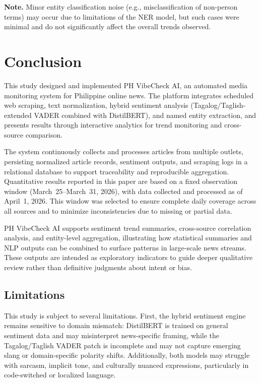\documentclass[sigconf, nonacm]{acmart}
\begin{document}
\textbf{Note.}
Minor entity classification noise (e.g., misclassification of non-person terms) may occur due to limitations of the NER model, but such cases were minimal and do not significantly affect the overall trends observed.

\section{Conclusion}
This study designed and implemented PH VibeCheck AI, an automated media monitoring system for Philippine online news. The platform integrates scheduled web scraping, text normalization, hybrid sentiment analysis (Tagalog/Taglish-extended VADER combined with DistilBERT), and named entity extraction, and presents results through interactive analytics for trend monitoring and cross-source comparison.

The system continuously collects and processes articles from multiple outlets, persisting normalized article records, sentiment outputs, and scraping logs in a relational database to support traceability and reproducible aggregation. Quantitative results reported in this paper are based on a fixed observation window (March~25--March~31, 2026), with data collected and processed as of April~1, 2026. This window was selected to ensure complete daily coverage across all sources and to minimize inconsistencies due to missing or partial data.

PH VibeCheck AI supports sentiment trend summaries, cross-source correlation analysis, and entity-level aggregation, illustrating how statistical summaries and NLP outputs can be combined to surface patterns in large-scale news streams. These outputs are intended as exploratory indicators to guide deeper qualitative review rather than definitive judgments about intent or bias.

\subsection{Limitations}
This study is subject to several limitations. First, the hybrid sentiment engine remains sensitive to domain mismatch: DistilBERT is trained on general sentiment data and may misinterpret news-specific framing, while the Tagalog/Taglish VADER patch is incomplete and may not capture emerging slang or domain-specific polarity shifts. Additionally, both models may struggle with sarcasm, implicit tone, and culturally nuanced expressions, particularly in code-switched or localized language.
\end{document}
